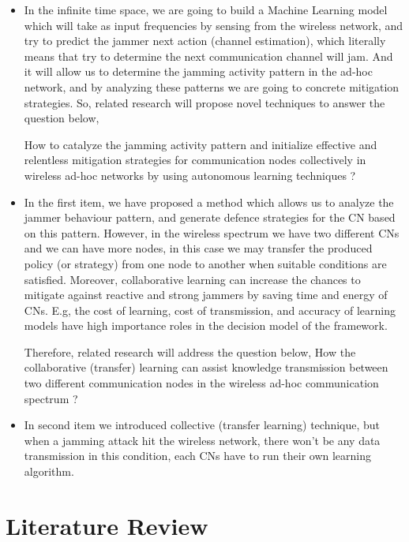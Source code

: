 \documentclass[letterpaper%
, oneside%
, 12pt%
,thesepararticles%
, english%
,creativecommons,hyperref, withAlgo2e%
]{thETS}
\begin{document}
\begin{itemize}
 \item {In the infinite time space, we are going to build a Machine Learning model which will take as input frequencies by sensing from the wireless network, and try to predict the jammer next action (channel estimation), which literally means that try to determine the next communication channel will jam. And it will allow us to determine the jamming activity pattern in the ad-hoc network, and by analyzing these patterns we are going to concrete  mitigation strategies. So, related research will propose novel techniques to answer the question below,
     
     How to catalyze the jamming activity pattern and initialize effective and relentless mitigation strategies for communication nodes collectively in wireless ad-hoc networks by using autonomous learning techniques ?}
     
 \item {In the first item, we have proposed a method which allows us to analyze the jammer behaviour pattern, and generate defence strategies for the CN based on this pattern. However, in the wireless spectrum we have two different CNs and we can have more nodes, in this case we may transfer the produced policy (or strategy) from one node to another when suitable conditions are satisfied. Moreover, collaborative learning can increase the chances to mitigate against reactive and strong jammers by saving time and energy of CNs. E.g, the cost of learning, cost of transmission, and accuracy of learning models have  high importance roles in the decision model of the framework. 
  
 	Therefore, related research will address the question below, 
 	How the collaborative (transfer) learning can assist knowledge transmission between two different communication nodes in the wireless ad-hoc communication spectrum ? 
 }

 \item{In second item we introduced collective (transfer learning) technique, but when a jamming attack hit the wireless network, there won't be any data transmission in this condition, each CNs have to run their own learning algorithm. } 
\end{itemize}




\chapter{Literature Review}
\end{document}
